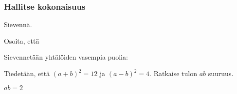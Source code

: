 \begin{tehtavasivu}
\subsubsection*{Hallitse kokonaisuus}

\begin{tehtava}
    Sievennä.
    \begin{vastaus}
    \end{vastaus}
\end{tehtava}

\begin{tehtava}
    Osoita, että
    \begin{vastaus}
    	Sievennetään yhtälöiden vasempia puolia:
    \end{vastaus}
\end{tehtava}

\begin{tehtava}
	Tiedetään, että $(a+b)^2=12$ ja $(a-b)^2=4$. Ratkaise tulon $ab$ suuruus.
    \begin{vastaus}
	$ab = 2$
    \end{vastaus}
\end{tehtava}


\end{tehtavasivu}
